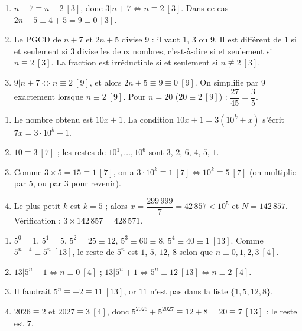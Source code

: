 \begin{corrige}
\begin{sol}
\begin{enumerate}
\item $n + 7 \equiv n - 2 \ [3]$, donc $3 | n+7 \iff n \equiv 2 \ [3]$. Dans ce cas $2n + 5 \equiv 4 + 5 = 9 \equiv 0 \ [3]$.
\item Le PGCD de $n+7$ et $2n+5$ divise $9$ : il vaut $1$, $3$ ou $9$. Il est diff\'erent de $1$ si et seulement si $3$ divise les deux nombres,
      c'est-\`a-dire si et seulement si $n \equiv 2 \ [3]$. La fraction est irr\'eductible si et seulement si $n \not\equiv 2 \ [3]$.
\item $9 | n + 7 \iff n \equiv 2 \ [9]$, et alors $2n + 5 \equiv 9 \equiv 0 \ [9]$. On simplifie par $9$ exactement lorsque $n \equiv 2 \ [9]$.
      Pour $n = 20$ ($20 \equiv 2 \ [9]$) : $\dfrac{27}{45} = \dfrac{3}{5}$.
\end{enumerate}
\end{sol}
%
\begin{sol}
\begin{enumerate}
\item Le nombre obtenu est $10x + 1$. La condition $10x + 1 = 3(10^k + x)$ s'\'ecrit $7x = 3 \cdot 10^k - 1$.
\item $10 \equiv 3 \ [7]$ ; les restes de $10^1, \ldots, 10^6$ sont $3$, $2$, $6$, $4$, $5$, $1$.
\item Comme $3 \times 5 = 15 \equiv 1 \ [7]$, on a $3 \cdot 10^k \equiv 1 \ [7] \iff 10^k \equiv 5 \ [7]$ (on multiplie par $5$, ou par $3$ pour revenir).
\item Le plus petit $k$ est $k = 5$ ; alors $x = \dfrac{299\,999}{7} = 42\,857 < 10^5$ et $\boxed{N = 142\,857}$.
      V\'erification : $3 \times 142\,857 = 428\,571$.
\end{enumerate}
\end{sol}
%
\begin{sol}
\begin{enumerate}
\item $5^0 = 1$, $5^1 = 5$, $5^2 = 25 \equiv 12$, $5^3 \equiv 60 \equiv 8$, $5^4 \equiv 40 \equiv 1 \ [13]$.
      Comme $5^{n+4} \equiv 5^n \ [13]$, le reste de $5^n$ est $1$, $5$, $12$, $8$ selon que $n \equiv 0, 1, 2, 3 \ [4]$.
\item $13 | 5^n - 1 \iff n \equiv 0 \ [4]$ ; $13 | 5^n + 1 \iff 5^n \equiv 12 \ [13] \iff n \equiv 2 \ [4]$.
\item Il faudrait $5^n \equiv -2 \equiv 11 \ [13]$, or $11$ n'est pas dans la liste $\{1, 5, 12, 8\}$.
\item $2026 \equiv 2$ et $2027 \equiv 3 \ [4]$, donc $5^{2026} + 5^{2027} \equiv 12 + 8 = 20 \equiv 7 \ [13]$ : le reste est $7$.

\end{enumerate}
\end{sol}
\end{corrige}
